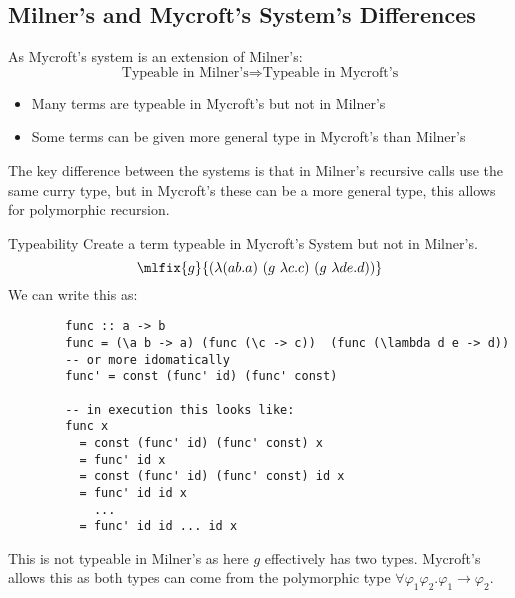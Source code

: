 \subsection{Milner's and Mycroft's System's Differences}
As Mycroft's system is an extension of Milner's:
\[\text{Typeable in Milner's} \Rightarrow \text{Typeable in Mycroft's}\]
\begin{itemize}
	\item Many terms are typeable in Mycroft's but not in Milner's
	\item Some terms can be given more general type in Mycroft's than Milner's
\end{itemize}
The key difference between the systems is that in Milner's recursive calls use the same curry type, but in Mycroft's these can be a more general type, this allows for polymorphic recursion.
\begin{examplebox}{Typeability}
	Create a term typeable in Mycroft's System but not in Milner's.
	\tcblower
	\[\mlfix{g}{(\lambda (ab.a) \ (g \ \lambda c . c) \ (g \ \lambda de.d ))}\]
	We can write this as:
	\begin{verbatim}
        func :: a -> b
        func = (\a b -> a) (func (\c -> c))  (func (\lambda d e -> d))
        -- or more idomatically
        func' = const (func' id) (func' const)
        
        -- in execution this looks like:
        func x
          = const (func' id) (func' const) x
          = func' id x
          = const (func' id) (func' const) id x
          = func' id id x
            ...
          = func' id id ... id x
    \end{verbatim}
	This is not typeable in Milner's as here $g$ effectively has two types. Mycroft's allows this as both types can come from the polymorphic type $\forall \varphi_1 \varphi_2 . \varphi_1 \to \varphi_2$.
\end{examplebox}
